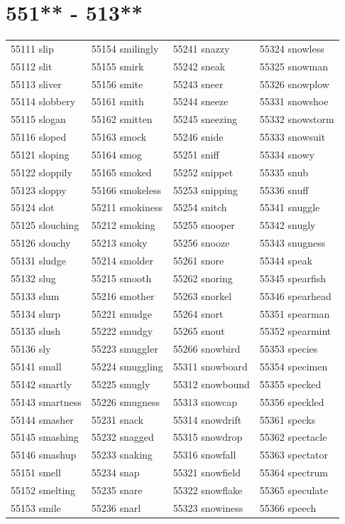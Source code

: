 \documentclass[10pt, oneside]{book}
\begin{document}
\begin{table}
	\centering
	\section*{551** - 513**}
	\begin{tabular}{l l l l}
55111 slip &55154 smilingly &55241 snazzy &55324 snowless\\
55112 slit &55155 smirk &55242 sneak &55325 snowman\\
55113 sliver &55156 smite &55243 sneer &55326 snowplow\\
55114 slobbery &55161 smith &55244 sneeze &55331 snowshoe\\
55115 slogan &55162 smitten &55245 sneezing &55332 snowstorm\\
55116 sloped &55163 smock &55246 snide &55333 snowsuit\\
55121 sloping &55164 smog &55251 sniff &55334 snowy\\
55122 sloppily &55165 smoked &55252 snippet &55335 snub\\
55123 sloppy &55166 smokeless &55253 snipping &55336 snuff\\
55124 slot &55211 smokiness &55254 snitch &55341 snuggle\\
55125 slouching &55212 smoking &55255 snooper &55342 snugly\\
55126 slouchy &55213 smoky &55256 snooze &55343 snugness\\
55131 sludge &55214 smolder &55261 snore &55344 speak\\
55132 slug &55215 smooth &55262 snoring &55345 spearfish\\
55133 slum &55216 smother &55263 snorkel &55346 spearhead\\
55134 slurp &55221 smudge &55264 snort &55351 spearman\\
55135 slush &55222 smudgy &55265 snout &55352 spearmint\\
55136 sly &55223 smuggler &55266 snowbird &55353 species\\
55141 small &55224 smuggling &55311 snowboard &55354 specimen\\
55142 smartly &55225 smugly &55312 snowbound &55355 specked\\
55143 smartness &55226 smugness &55313 snowcap &55356 speckled\\
55144 smasher &55231 snack &55314 snowdrift &55361 specks\\
55145 smashing &55232 snagged &55315 snowdrop &55362 spectacle\\
55146 smashup &55233 snaking &55316 snowfall &55363 spectator\\
55151 smell &55234 snap &55321 snowfield &55364 spectrum\\
55152 smelting &55235 snare &55322 snowflake &55365 speculate\\
55153 smile &55236 snarl &55323 snowiness &55366 speech\\
	\end{tabular}
 \end{table}
\clearpage
\end{document}
